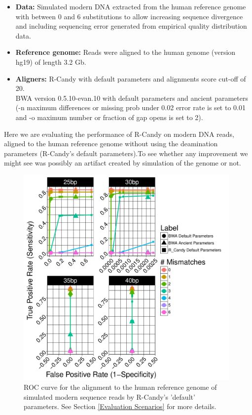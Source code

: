 \documentclass[11pt,a4paper]{report}
\begin{document}
 \begin{itemize}
 
   \item \textbf{Data:} Simulated modern DNA extracted from the human reference genome 
   with between 0 and 6 substitutions to allow increasing sequence divergence
   and including sequencing error generated from empirical quality distribution
   data.
   
   \item \textbf{Reference genome:} Reads were aligned to the human genome 
   (version hg19) of length 3.2 Gb.

    \item \textbf{Aligners:} 
    R-Candy with default parameters and alignments score cut-off of 20. \\
    BWA version 0.5.10-evan.10 with default parameters and ancient parameters
    (-n maximum differences or missing prob under 0.02 error rate is set to 0.01 
     and -o maximum number or fraction of gap opens is set to 2)\cite{green2010draft}.

 \end{itemize}
	
	
Here we are evaluating the performance of R-Candy on modern DNA reads, aligned 
to the human reference genome without using the deamination parameters (R-Candy's 
default parameters).To see whether any improvement we might see was possibly an artifact
created by simulation of the genome or not.


\begin{figure}[H]
\centering
\includegraphics[width=11cm]{pictures/f_DS6_emp.pdf}
\caption{ 
ROC curve for the alignment to the human reference genome of simulated 
modern sequence reads by R-Candy's 'default' parameters. See Section 
\ref{Evaluation Scenarios} 
for more details.
}
\label{DS6_emp}
\end{figure}
 
\end{document}
